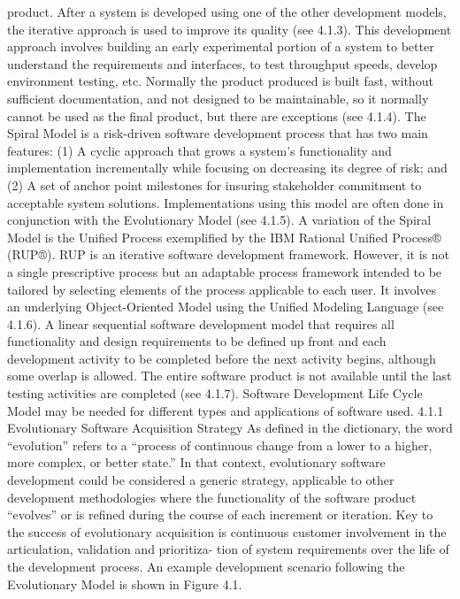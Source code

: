 \documentclass[a4paper,12pt]{book}
\begin{document}
product. After a system is developed using one of the other development models, the iterative
approach is used to improve its quality (see 4.1.3).
This development approach involves building an early experimental portion of a system to better
understand the requirements and interfaces, to test throughput speeds, develop environment
testing, etc. Normally the product produced is built fast, without sufficient documentation, and not
designed to be maintainable, so it normally cannot be used as the final product, but there are
exceptions (see 4.1.4).
The Spiral Model is a risk-driven software development process that has two main features: (1) A
cyclic approach that grows a system’s functionality and implementation incrementally while focusing
on decreasing its degree of risk; and (2) A set of anchor point milestones for insuring stakeholder
commitment to acceptable system solutions. Implementations using this model are often done in
conjunction with the Evolutionary Model (see 4.1.5).
A variation of the Spiral Model is the Unified Process exemplified by the IBM Rational Unified
Process® (RUP®). RUP is an iterative software development framework. However, it is not a single
prescriptive process but an adaptable process framework intended to be tailored by selecting
elements of the process applicable to each user. It involves an underlying Object-Oriented Model
using the Unified Modeling Language (see 4.1.6).
A linear sequential software development model that requires all functionality and design
requirements to be defined up front and each development activity to be completed before the next
activity begins, although some overlap is allowed. The entire software product is not available until
the last testing activities are completed (see 4.1.7).
Software Development Life Cycle Model may be needed for
different types and applications of software used.
4.1.1 Evolutionary Software
Acquisition Strategy
As defined in the dictionary, the word “evolution” refers to
a “process of continuous change from a lower to a higher,
more complex, or better state.” In that context, evolutionary
software development could be considered a generic strategy,
applicable to other development methodologies where the
functionality of the software product “evolves” or is refined
during the course of each increment or iteration. Key to the
success of evolutionary acquisition is continuous customer
involvement in the articulation, validation and prioritiza-
tion of system requirements over the life of the development
process. An example development scenario following the
Evolutionary Model is shown in Figure 4.1.
\end{document}
